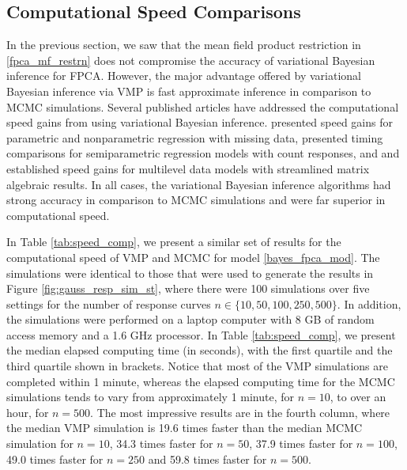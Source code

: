 \documentclass[12pt]{article}
\theoremstyle{plain}
\theoremstyle{definition}
\theoremstyle{remark}
\begin{document}

\subsection{Computational Speed Comparisons}
\label{sec:speed_comp}

In the previous section, we saw that the mean field product restriction in \eqref{fpca_mf_restrn} does not
compromise the accuracy of variational Bayesian inference for FPCA. However,
the major advantage offered by variational Bayesian inference via VMP is fast approximate inference in 
comparison to MCMC simulations. Several published articles have addressed the computational speed gains
from using variational Bayesian inference.  presented speed gains for parametric and nonparametric
regression with missing data,  presented timing comparisons for semiparametric regression
models with count responses, and
 and  established speed gains for multilevel data models
with streamlined matrix algebraic results.
In all cases, the variational Bayesian inference algorithms had strong accuracy in
comparison to MCMC simulations and were far superior in computational speed.

In Table \ref{tab:speed_comp}, we present a similar set of results for the computational speed of VMP and MCMC
for model \eqref{bayes_fpca_mod}. The simulations were identical to those that were used to generate the
results in Figure \ref{fig:gauss_resp_sim_st}, where there were 100 simulations over five settings for the number
of response curves $n \in \{10, 50, 100, 250, 500\}$. In addition, the simulations were performed on a laptop computer
with 8 GB of random access memory and a 1.6 GHz processor. In Table \ref{tab:speed_comp},
we present the median elapsed computing time (in seconds),
with the first quartile and the third quartile shown in brackets.
Notice that most of the VMP simulations are completed within 1 minute, whereas the elapsed computing time
for the MCMC simulations tends to vary from approximately 1 minute, for $n = 10$, to over an hour, for $n = 500$.
The most impressive results are in the fourth column, where the median VMP simulation is 19.6 times faster
than the median MCMC simulation for $n = 10$, 34.3 times faster for $n = 50$, 37.9 times faster for $n = 100$,
49.0 times faster for $n = 250$ and 59.8 times faster for $n = 500$.
\end{document}
